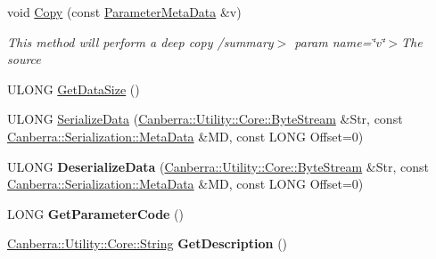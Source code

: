 \begin{DoxyCompactItemize}
void \hyperlink{class_canberra_1_1_data_types_1_1_application_1_1_parameter_meta_data_a12bae5d103b61971672c6131c7559bb4_a12bae5d103b61971672c6131c7559bb4}{Copy} (const \hyperlink{class_canberra_1_1_data_types_1_1_application_1_1_parameter_meta_data}{Parameter\+Meta\+Data} \&v)
\begin{DoxyCompactList}\small\item\em This method will perform a deep copy /summary$>$ param name=\char`\"{}v\char`\"{}$>$The source\end{DoxyCompactList}\item 
U\+L\+O\+NG \hyperlink{class_canberra_1_1_data_types_1_1_application_1_1_parameter_meta_data_ae089f2f14f1c3779cfa98b7668aea64b_ae089f2f14f1c3779cfa98b7668aea64b}{Get\+Data\+Size} ()
\item 
U\+L\+O\+NG \hyperlink{class_canberra_1_1_data_types_1_1_application_1_1_parameter_meta_data_a372d2c553626789fed5999e1395363ed_a372d2c553626789fed5999e1395363ed}{Serialize\+Data} (\hyperlink{class_canberra_1_1_utility_1_1_core_1_1_byte_stream}{Canberra\+::\+Utility\+::\+Core\+::\+Byte\+Stream} \&Str, const \hyperlink{class_canberra_1_1_serialization_1_1_meta_data}{Canberra\+::\+Serialization\+::\+Meta\+Data} \&MD, const L\+O\+NG Offset=0)
\item 
\mbox{\label{class_canberra_1_1_data_types_1_1_application_1_1_parameter_meta_data_a0d077f43ddc78fa51007f7fc7f0c9deb}} 
U\+L\+O\+NG {\bfseries Deserialize\+Data} (\hyperlink{class_canberra_1_1_utility_1_1_core_1_1_byte_stream}{Canberra\+::\+Utility\+::\+Core\+::\+Byte\+Stream} \&Str, const \hyperlink{class_canberra_1_1_serialization_1_1_meta_data}{Canberra\+::\+Serialization\+::\+Meta\+Data} \&MD, const L\+O\+NG Offset=0)
\item 
\mbox{\label{class_canberra_1_1_data_types_1_1_application_1_1_parameter_meta_data_a8229ef09816c07666123d942d6f213b8}} 
L\+O\+NG {\bfseries Get\+Parameter\+Code} ()
\item 
\mbox{\label{class_canberra_1_1_data_types_1_1_application_1_1_parameter_meta_data_a0229a8886e082b261c3006247867a6c3}} 
\hyperlink{class_canberra_1_1_utility_1_1_core_1_1_string}{Canberra\+::\+Utility\+::\+Core\+::\+String} {\bfseries Get\+Description} ()

\end{DoxyCompactItemize}
